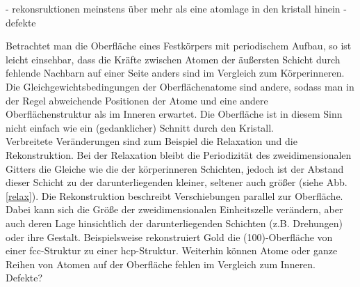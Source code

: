 
 - rekonsruktionen meinstens über mehr als eine atomlage in den kristall hinein 
 - defekte
 

 Betrachtet man die Oberfläche eines Festkörpers mit periodischem Aufbau, so ist leicht einsehbar,
 dass die Kräfte zwischen Atomen der äußersten Schicht durch fehlende Nachbarn auf einer Seite
 anders sind im Vergleich zum Körperinneren. Die Gleichgewichtsbedingungen der Oberflächenatome sind 
andere, sodass man in der Regel abweichende Positionen der Atome und eine andere Oberflächenstruktur
als im Inneren erwartet. Die Oberfläche ist in diesem Sinn nicht einfach wie ein (gedanklicher)
Schnitt durch den Kristall.\\
 Verbreitete Veränderungen sind zum Beispiel die Relaxation und die Rekonstruktion. Bei der
 Relaxation bleibt die Periodizität des zweidimensionalen Gitters die Gleiche wie die der
 körperinneren Schichten, jedoch ist der Abstand dieser Schicht zu der
 darunterliegenden kleiner, seltener auch größer (siehe Abb. \ref{relax}). Die Rekonstruktion
 beschreibt Verschiebungen parallel zur Oberfläche. Dabei kann sich die Größe der
 zweidimensionalen Einheitszelle verändern, aber auch deren Lage hinsichtlich der darunterliegenden
 Schichten (z.B. Drehungen) oder ihre Gestalt.  Beispielsweise rekonstruiert Gold die
  (100)-Oberfläche von einer fcc-Struktur zu einer hcp-Struktur.%
 Weiterhin können Atome oder ganze Reihen von Atomen auf der Oberfläche fehlen im Vergleich zum
 Inneren. \\
 Defekte?
\\

 
